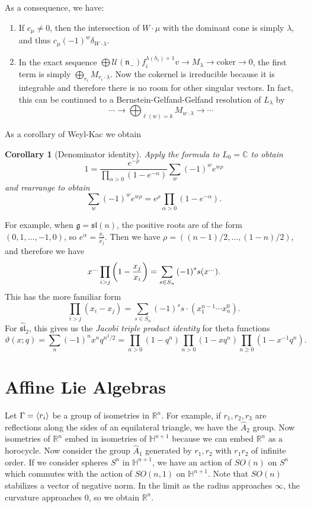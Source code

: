 \documentclass[leqno, openany]{memoir}
\newtheorem{cor}[thm]{Corollary}
\theoremstyle{definition}
\theoremstyle{remark}
\theoremstyle{plain}
\theoremstyle{definition}
\theoremstyle{remark}
\newcommand{\R}{\mathbb{R}}
\newcommand{\C}{\mathbb{C}}
\renewcommand{\H}{\mathbb{H}}
\newcommand{\mc}[1]{\mathcal{#1}}
\newcommand{\mf}[1]{\mathfrak{#1}}
\newcommand{\mr}[1]{\mathrm{#1}}
\newcommand{\wh}[1]{\widehat{#1}}
\begin{document}
As a consequence, we have:
\begin{enumerate}
    \item If $c_{\mu} \neq 0$, then the intersection of $W \cdot \mu$ with the dominant cone is simply $\lambda$, and thus $c_{\mu} {(-1)}^w \delta_{W \cdot \lambda}$.
    \item In the exact sequence $\bigoplus \mc{U}(\mf{n}_-) f_i^{\lambda(h_i)+1} v \to M_{\lambda} \to \mr{coker} \to 0$, the first term is simply $\bigoplus_{r_i} M_{r_i \cdot \lambda}$. Now the cokernel is irreducible because it is integrable and therefore there is no room for other singular vectors. In fact, this can be continued to a Bernstein-Gelfand-Gelfand resolution of $L_{\lambda}$ by
        \[ \cdots \to \bigoplus_{\ell(w)=k} M_{w \cdot \lambda} \to \cdots \]
\end{enumerate}

As a corollary of Weyl-Kac we obtain 
\begin{cor}[Denominator identity]
    Apply the formula to $L_0 = \C$ to obtain
    \[ 1 = \frac{e^{-\rho}}{\prod_{\alpha > 0} (1-e^{-\alpha})} \sum_w {(-1)}^w e^{w \rho} \]
    and rearrange to obtain
    \[ \sum_w {(-1)}^w e^{w \rho} = e^{\rho} \prod_{\alpha > 0} (1-e^{-\alpha}). \]
\end{cor}

For example, when $\mf{g} = \mf{sl}(n)$, the positive roots are of the form $(0, 1, \ldots, -1, 0)$, so $e^{\alpha} = \frac{x_i}{x_j}$. Then we have $\rho = ((n-1)/2, \ldots, (1-n)/2)$, and therefore we have
\[ x^{\ldots} \prod_{i > j} \qty(1-\frac{x_j}{x_i}) = \sum_{s \in S_n} {(-1)}^s s(x^{\ldots}). \]
This has the more familiar form
\[ \prod_{i > j} (x_i - x_j) = \sum_{s\in S_n} {(-1)}^s s \cdot (x_1^{n-1} \cdots x_n^0). \]
For $\wh{\mf{sl}}_2$, this gives us the \textit{Jacobi triple product identity} for theta functions
\[ \vartheta(x;q) = \sum_n {(-1)}^n x^n q^{n^2/2} = \prod_{n > 0} (1-q^n) \prod_{n>0} (1-xq^n) \prod_{n \geq 0} (1-x^{-1} q^n). \]

\section{Affine Lie Algebras}%
\label{sec:affine_lie_algebras}

Let $\Gamma = \ev{r_i}$ be a group of isometries in $\R^n$. For example, if $r_1, r_2, r_3$ are reflections along the sides of an equilateral triangle, we have the $\wh{A}_2$ group. Now isometries of $\R^n$ embed in isometries of $\H^{n+1}$ because we can embed $\R^n$ as a horocycle. Now consider the group $\wh{A}_1$ generated by $r_1, r_2$ with $r_1 r_2$ of infinite order. If we consider spheres $S^n$ in $\H^{n+1}$, we have an action of $SO(n)$ on $S^n$ which commutes with the action of $SO(n,1)$ on $\H^{n+1}$. Note that $SO(n)$ stabilizes a vector of negative norm. In the limit as the radius approaches $\infty$, the curvature approaches $0$, so we obtain $\R^n$.
\end{document}

